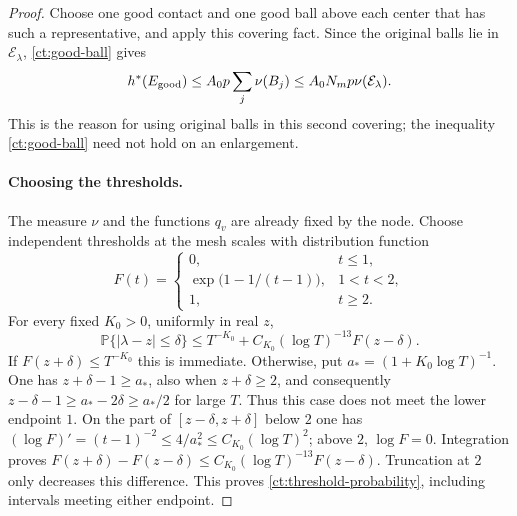 \begin{proof}
Choose one good contact and one good ball above each center that has
such a representative, and apply this covering fact.  Since the
original balls lie in $\mathcal E_\lambda$, \eqref{ct:good-ball}
gives
\begin{equation}\label{ct:good-total}
 h^*(E_{\rm good})
 \le A_0p\sum_j\nu(B_j)
 \le A_0N_mp\nu(\mathcal E_\lambda).
\end{equation}
This is the reason for using original balls in this second covering;
the inequality \eqref{ct:good-ball} need not hold on an enlargement.

\paragraph{Choosing the thresholds.}
The measure $\nu$ and the functions $q_v$ are already fixed by the
node.  Choose independent thresholds at the mesh scales with
distribution function
\begin{equation}\label{ct:threshold-law}
 F(t)=
 \begin{cases}
 0,&t\le1,\\
 \exp\bigl(1-1/(t-1)\bigr),&1<t<2,\\
 1,&t\ge2.
 \end{cases}
\end{equation}
For every fixed $K_0>0$, uniformly in real $z$,
\begin{equation}\label{ct:threshold-probability}
 \mathbb P\{|\lambda-z|\le\delta\}
 \le T^{-K_0}+C_{K_0}(\log T)^{-13}F(z-\delta).
\end{equation}
If $F(z+\delta)\le T^{-K_0}$ this is immediate.  Otherwise, put
$a_*=(1+K_0\log T)^{-1}$.  One has $z+\delta-1\ge a_*$,
also when $z+\delta\ge2$, and consequently
$z-\delta-1\ge a_*-2\delta\ge a_*/2$ for large $T$.
Thus this case does not meet the lower endpoint $1$.  On the part
of $[z-\delta,z+\delta]$ below $2$ one has
$(\log F)'=(t-1)^{-2}\le4/a_*^2\le C_{K_0}(\log T)^2$;
above $2$, $\log F=0$.  Integration proves
$F(z+\delta)-F(z-\delta)
 \le C_{K_0}(\log T)^{-13}F(z-\delta)$.
Truncation at $2$ only decreases this difference.  This proves
\eqref{ct:threshold-probability}, including intervals meeting either
endpoint.


\end{proof}
